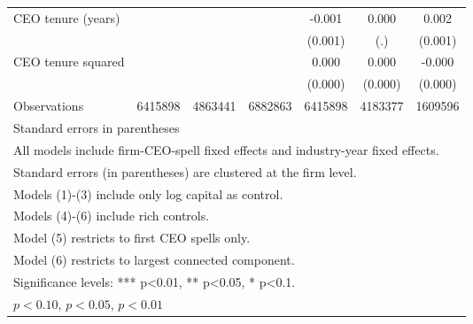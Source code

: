 \begin{table}[htbp]
\begin{tabular}{l*{6}{c}}
\addlinespace
CEO tenure (years)  &                     &                     &                     &      -0.001\sym{**} &       0.000         &       0.002         \\
                    &                     &                     &                     &     (0.001)         &         (.)         &     (0.001)         \\
\addlinespace
CEO tenure squared  &                     &                     &                     &       0.000         &       0.000         &      -0.000\sym{***}\\
                    &                     &                     &                     &     (0.000)         &     (0.000)         &     (0.000)         \\
\midrule
Observations        &     6415898         &     4863441         &     6882863         &     6415898         &     4183377         &     1609596         \\
\bottomrule
\multicolumn{7}{l}{\footnotesize Standard errors in parentheses}\\
\multicolumn{7}{l}{\footnotesize All models include firm-CEO-spell fixed effects and industry-year fixed effects.}\\
\multicolumn{7}{l}{\footnotesize Standard errors (in parentheses) are clustered at the firm level.}\\
\multicolumn{7}{l}{\footnotesize Models (1)-(3) include only log capital as control.}\\
\multicolumn{7}{l}{\footnotesize Models (4)-(6) include rich controls.}\\
\multicolumn{7}{l}{\footnotesize Model (5) restricts to first CEO spells only.}\\
\multicolumn{7}{l}{\footnotesize Model (6) restricts to largest connected component.}\\
\multicolumn{7}{l}{\footnotesize Significance levels: *** p<0.01, ** p<0.05, * p<0.1.}\\
\multicolumn{7}{l}{\footnotesize \sym{*} \(p<0.10\), \sym{**} \(p<0.05\), \sym{***} \(p<0.01\)}\\
\end{tabular}
\end{table}
